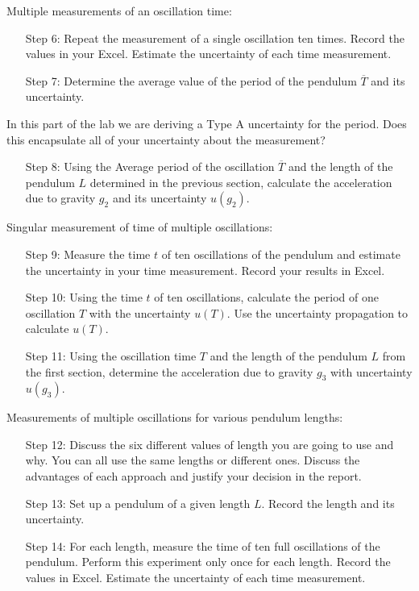\documentclass[12pt, a4paper, oneside, openright, titlepage]{book}
\begin{document}
Multiple measurements of an oscillation time:


\begin{itemize}[leftmargin = 50pt]
    \item[Step 6:] Repeat the measurement of a single oscillation ten times. Record the values in your Excel. Estimate the uncertainty of each time measurement.
    \item[Step 7:] Determine the average value of the period of the pendulum $\overline{T}$ and its uncertainty.
\end{itemize}

In this part of the lab we are deriving a Type A uncertainty for the period. Does this encapsulate all of your uncertainty about the measurement? 


\begin{itemize}[leftmargin = 50pt]
    \item[Step 8:] Using the Average period of the oscillation $\overline{T}$ and the length of the pendulum $L$ determined in the previous section, calculate the acceleration due to gravity $g_2$ and its uncertainty $u(g_2)$.
\end{itemize}

Singular measurement of time of multiple oscillations:


\begin{itemize}[leftmargin = 50pt]
    \item[Step 9:] Measure the time $t$ of ten oscillations of the pendulum and estimate the uncertainty in your time measurement. Record your results in Excel.
    \item[Step 10:] Using the time $t$ of ten oscillations, calculate the period of one oscillation $T$ with the uncertainty $u(T)$. Use the uncertainty propagation to calculate $u(T)$.
    \item[Step 11:] Using the oscillation time $T$ and the length of the pendulum $L$ from the first section, determine the acceleration due to gravity $g_3$ with uncertainty $u(g_3)$.
\end{itemize}

Measurements of multiple oscillations for various pendulum lengths:


\begin{itemize}[leftmargin = 50pt]
    \item[Step 12:] Discuss the six different values of length you are going to use and why. You can all use the same lengths or different ones. Discuss the advantages of each approach and justify your decision in the report.
    \item[Step 13:] Set up a pendulum of a given length $L$. Record the length and its uncertainty.
    \item[Step 14:] For each length, measure the time of ten full oscillations of the pendulum. Perform this experiment only once for each length. Record the values in Excel. Estimate the uncertainty of each time measurement.
\end{itemize}
\end{document}
